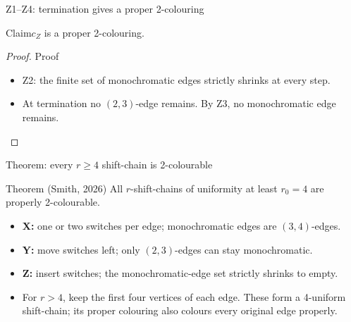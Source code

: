 \begin{frame}[t]{Z1--Z4: termination gives a proper 2-colouring}
  \footnotesize{}
  \claimreminder{\Ztwo\Zthree\Zinsertnotation}
  \begin{lemma}{Claim}$c_Z$ is a proper 2-colouring.\end{lemma}
  \begin{proof}{Proof}
    \begin{itemize}[itemsep=4pt]
      \item<1-> Z2: the finite set of monochromatic edges strictly shrinks at every step.
      \item<2-> At termination no $(2,3)$-edge remains. By Z3, no monochromatic edge remains.
    \end{itemize}
  \end{proof}
  \begin{center}
  \end{center}
\end{frame}

\begin{frame}[t]{Theorem: every $r\geq4$ shift-chain is 2-colourable}
  \footnotesize{}
  \claimreminder{\Xone\Xthree\Ysix\Ztwo\Zthree}
  \begin{theorem}{Theorem (Smith, 2026)}
    All $r$-shift-chains of uniformity at least $r_0=4$ are properly 2-colourable.
  \end{theorem}
  \begin{itemize}[itemsep=5pt]
    \item<1-> \textbf{X:} one or two switches per edge;
      monochromatic edges are $(3,4)$-edges.
    \item<2-> \textbf{Y:} move switches left;
      only $(2,3)$-edges can stay monochromatic.
    \item<3-> \textbf{Z:} insert switches;
      the monochromatic-edge set strictly shrinks to empty.
    \item<4-> For $r>4$, keep the first four vertices of each edge.
      These form a 4-uniform shift-chain; its proper colouring also colours every original edge properly.
  \end{itemize}
\end{frame}
